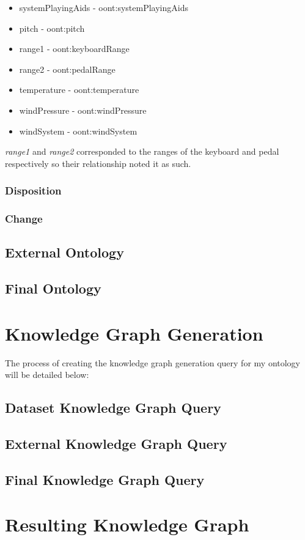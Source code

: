 \begin{itemize}
    \item systemPlayingAids - oont:systemPlayingAids
    \item pitch - oont:pitch
    \item range1 -  oont:keyboardRange
    \item range2 - oont:pedalRange
    \item temperature - oont:temperature
    \item windPressure - oont:windPressure
    \item windSystem - oont:windSystem
\end{itemize}

\textit{range1} and \textit{range2} corresponded to the ranges of the keyboard and pedal respectively so their relationship noted it as such. 

\subsubsection{Disposition}


\subsubsection{Change}


\subsection{External Ontology}

\subsection{Final Ontology}


\section{Knowledge Graph Generation}
\hspace*{0.5cm} The process of creating the knowledge graph generation query for my ontology will be detailed below:

\subsection{Dataset Knowledge Graph Query}

\subsection{External Knowledge Graph Query}

\subsection{Final Knowledge Graph Query}


\section{Resulting Knowledge Graph}
\hspace*{0.5cm} 




